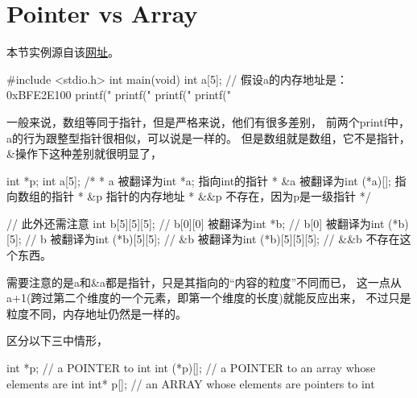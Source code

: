 ﻿\section[Pointer vs Array]{Pointer vs Array}
本节实例源自该\href{http://coolshell.cn/articles/5761.html}{网址}。

\begin{cppcode}
#include <stdio.h>
int main(void)
{
  int a[5];             // 假设a的内存地址是：0xBFE2E100
  printf("%
  printf("%
  printf("%
  printf("%
}
\end{cppcode}

一般来说，数组等同于指针，但是严格来说，他们有很多差别，
前两个printf中，a的行为跟整型指针很相似，可以说是一样的。
但是数组就是数组，它不是指针，\&操作下这种差别就很明显了，

\begin{cppcode}
int *p;
int a[5];
/*
 * a    被翻译为int *a; 指向int的指针
 * &a   被翻译为int (*a)[]; 指向数组的指针
 * &p   指针的内存地址
 * &&p  不存在，因为p是一级指针
 */
 
// 此外还需注意
int b[5][5][5];
// b[0][0]  被翻译为int *b;
// b[0]     被翻译为int (*b)[5];
// b        被翻译为int (*b)[5][5];
// &b       被翻译为int (*b)[5][5][5];
// &&b      不存在这个东西。
\end{cppcode}

需要注意的是a和\&a都是指针，只是其指向的“内容的粒度”不同而已，
这一点从a+1(跨过第二个维度的一个元素，即第一个维度的长度)就能反应出来，
不过只是粒度不同，内存地址仍然是一样的。

区分以下三中情形，

\begin{cppcode}
int *p;
// a POINTER to int
int (*p)[];
// a POINTER to an array whose elements are int
int* p[];
// an ARRAY whose elements are pointers to int
\end{cppcode}
